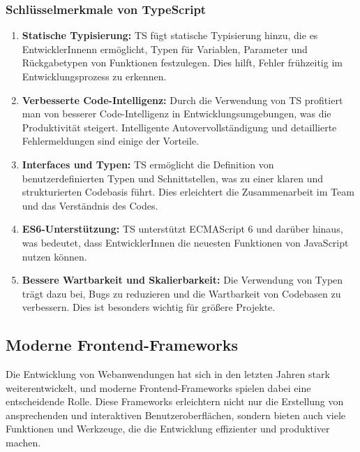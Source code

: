 \subsubsection{Schlüsselmerkmale von TypeScript}

\begin{enumerate}
    \item \textbf{Statische Typisierung:} \acl{TS} fügt statische Typisierung hinzu, die es EntwicklerInnenn ermöglicht, Typen für Variablen, Parameter und Rückgabetypen von Funktionen festzulegen. Dies hilft, Fehler frühzeitig im Entwicklungsprozess zu erkennen.

    \item \textbf{Verbesserte Code-Intelligenz:} Durch die Verwendung von \acl{TS} profitiert man von besserer Code-Intelligenz in Entwicklungsumgebungen, was die Produktivität steigert. Intelligente Autovervollständigung und detaillierte Fehlermeldungen sind einige der Vorteile.

    \item \textbf{Interfaces und Typen:} \acl{TS} ermöglicht die Definition von benutzerdefinierten Typen und Schnittstellen, was zu einer klaren und strukturierten Codebasis führt. Dies erleichtert die Zusammenarbeit im Team und das Verständnis des Codes.

    \item \textbf{ES6-Unterstützung:} \acl{TS} unterstützt ECMAScript 6 und darüber hinaus, was bedeutet, dass EntwicklerInnen die neuesten Funktionen von JavaScript nutzen können.

    \item \textbf{Bessere Wartbarkeit und Skalierbarkeit:} Die Verwendung von Typen trägt dazu bei, Bugs zu reduzieren und die Wartbarkeit von Codebasen zu verbessern. Dies ist besonders wichtig für größere Projekte.
\end{enumerate}

\subsection{Moderne Frontend-Frameworks}
\label{chapter:3-frontend-frameworks}

Die Entwicklung von Webanwendungen hat sich in den letzten Jahren stark weiterentwickelt, und moderne Frontend-Frameworks spielen dabei eine entscheidende Rolle. Diese Frameworks erleichtern nicht nur die Erstellung von ansprechenden und interaktiven Benutzeroberflächen, sondern bieten auch viele Funktionen und Werkzeuge, die die Entwicklung effizienter und produktiver machen.

